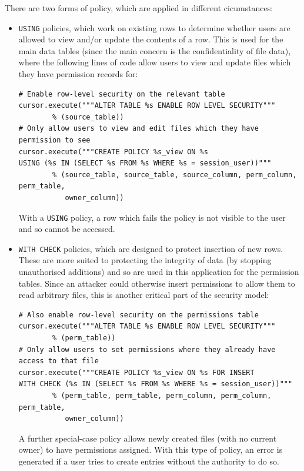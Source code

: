 \documentclass{article}
\begin{document}
There are two forms of policy, which are applied in different cicumstances\cite{postgres-policy}:
\begin{itemize}
\item
  \texttt{USING} policies, which work on existing rows to determine whether users are allowed to view and/or update the contents of a row. This is used for the main data tables (since the main concern is the confidentiality of file data), where the following lines of code allow users to view and update files which they have permission records for:

\begin{verbatim}
# Enable row-level security on the relevant table
cursor.execute("""ALTER TABLE %s ENABLE ROW LEVEL SECURITY"""
        % (source_table))
# Only allow users to view and edit files which they have permission to see
cursor.execute("""CREATE POLICY %s_view ON %s
USING (%s IN (SELECT %s FROM %s WHERE %s = session_user))"""
        % (source_table, source_table, source_column, perm_column, perm_table,
           owner_column))
\end{verbatim}

  With a \texttt{USING} policy, a row which fails the policy is not visible to the user and so cannot be accessed.

\item
  \texttt{WITH CHECK} policies, which are designed to protect insertion of new rows. These are more suited to protecting the integrity of data (by stopping unauthorised additions) and so are used in this application for the permission tables. Since an attacker could otherwise insert permissions to allow them to read arbitrary files, this is another critical part of the security model:

\begin{verbatim}
# Also enable row-level security on the permissions table
cursor.execute("""ALTER TABLE %s ENABLE ROW LEVEL SECURITY"""
        % (perm_table))
# Only allow users to set permissions where they already have access to that file
cursor.execute("""CREATE POLICY %s_view ON %s FOR INSERT
WITH CHECK (%s IN (SELECT %s FROM %s WHERE %s = session_user))"""
        % (perm_table, perm_table, perm_column, perm_column, perm_table,
           owner_column))
\end{verbatim}

  A further special-case policy allows newly created files (with no current owner) to have permissions assigned. With this type of policy, an error is generated if a user tries to create entries without the authority to do so.

\end{itemize}
\end{document}
